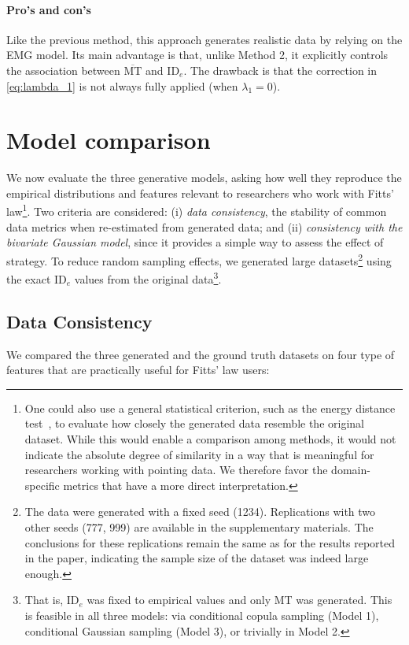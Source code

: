 \documentclass[acmlarge, manuscript,review]{acmart}
\newcommand{\mmt}{\ensuremath{\overline{\mt}}\xspace}
\newcommand{\mt}{\ensuremath{{\text{MT}}}\xspace}
\newcommand{\ide}{\ensuremath{{\text{ID}_e}}\xspace}
\begin{document}
\paragraph{Pro's and con's} 
Like the previous method, this approach generates realistic data by relying on the EMG model. Its main advantage is that, unlike Method 2, it explicitly controls the association between \mmt and \ide. The drawback is that the correction in \autoref{eq:lambda_1} is not always fully applied (\ie when $\lambda_1 = 0$).




\section{Model comparison}
We now evaluate the three generative models, asking how well they reproduce the empirical distributions and features relevant to researchers who work with Fitts' law\footnote{One could also use a general statistical criterion, such as the energy distance test~\cite{szekely2004}, to evaluate how closely the generated data resemble the original dataset. While this would enable a comparison among methods, it would not indicate the absolute degree of similarity in a way that is meaningful for researchers working with pointing data. We therefore favor the domain-specific metrics that have a more direct interpretation.}. Two criteria are considered: (i) \textit{data consistency}, the stability of common data metrics when re-estimated from generated data; and (ii) \textit{consistency with the bivariate Gaussian model}, since it provides a simple way to assess the effect of strategy. To reduce random sampling effects, we generated large datasets\footnote{The data were generated with a fixed seed (1234). Replications with two other seeds (777, 999) are available in the supplementary materials. The conclusions for these replications remain the same as for the results reported in the paper, indicating the sample size of the dataset was indeed large enough.} using the exact \ide values from the original data\footnote{That is, \ide was fixed to empirical values and only MT was generated. This is feasible in all three models: via conditional copula sampling (Model 1), conditional Gaussian sampling (Model 3), or trivially in Model 2.}.



\subsection{Data Consistency \label{subs:consistency}}
We compared the three generated and the ground truth datasets on four type of features that are practically useful for Fitts' law users:
\end{document}
